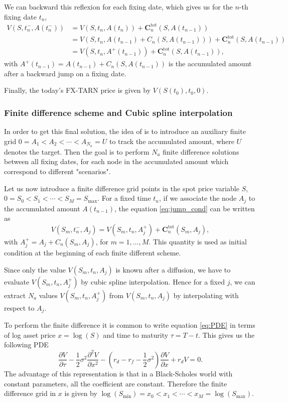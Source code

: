 We can backward this reflexion for each fixing date, which gives us for the $n$-th fixing date $t_n$,
\begin{align}\label{eq:jump_cond}
V(S,t_n^-,A(t_n^-)) &= V(S,t_n,A(t_n))+\mathbf{C}^\text{tot}_n(S,A(t_{n-1}))\nonumber\\
&=V(S,t_n,A(t_{n-1})+C_n(S,A(t_{n-1})))+\mathbf{C}^\text{tot}_n(S,A(t_{n-1}))\nonumber\\
&=V(S,t_n,A^+(t_{n-1}))+\mathbf{C}^\text{tot}_n(S,A(t_{n-1})),
\end{align}
with $A^+(t_{n-1})=A(t_{n-1})+C_n(S,A(t_{n-1}))$ is the accumulated amount after a backward jump on a fixing date.

Finally, the today's FX-TARN price is given by $V(S(t_0),t_0,0)$.

\subsubsection{Finite difference scheme and Cubic spline interpolation}
In order to get this final solution, the idea of \citeauthor{LS15} is to introduce an auxiliary finite grid $0 = A_1<A_2<\cdots<A_{N_a}= U$ to track the accumulated amount, where $U$ denotes the target. Then the goal is to perform $N_a$ finite difference solutions between all fixing dates, for each node in the accumulated amount which correspond to different "scenarios". 

Let us now introduce a finite difference grid points in the spot price variable $S$, $0 = S_0 < S_1 <\cdots<S_M = S_{\max}$. For a fixed time $t_n$, if we associate the node $A_j$ to the accumulated amount $A(t_{n-1})$, the equation \eqref{eq:jump_cond} can be written as
$$V(S_m,t^-_n,A_j) = V(S_m,t_n,A^+_j)+ \mathbf{C}^\text{tot}_n(S_m,A_j),$$
with $A_j^+ = A_j + C_n(S_m,A_j)$, for $m=1,\ldots,M$. This quantity is used as initial condition at the beginning of each finite different scheme.

Since only the value $V(S_m,t_n,A_j)$ is known after a diffusion, we have to evaluate $V(S_m,t_n,A_j^+)$ by cubic spline interpolation. Hence for a fixed $j$, we can extract $N_a$ values $V(S_m,t_n,A_j^+)$ from $V(S_m,t_n,A_j)$ by interpolating with respect to $A_j$.

To perform the finite difference it is common to write equation \eqref{eq:PDE} in terms of log asset price $x = \log(S)$ and time to maturity $\tau=T-t$. This gives us the following PDE
$$\frac{\partial V}{\partial \tau}-\frac{1}{2}\sigma^2\frac{\partial^2 V}{\partial x^2}-\left(r_d - r_f - \frac{1}{2}\sigma^2\right)\frac{\partial V}{\partial x}+r_d V = 0.$$
The advantage of this representation is that in a Black-Scholes world with constant parameters, all the coefficient are constant. Therefore the finite difference grid in $x$ is given by $\log(S_{\min}) = x_0 < x_1<\cdots<x_M = \log(S_{\max})$. 

